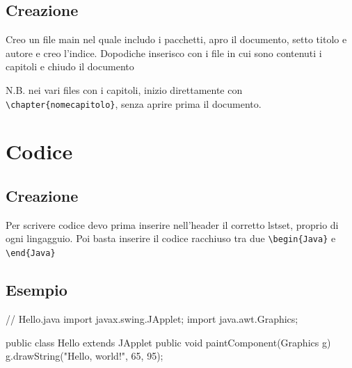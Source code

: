 \section{Creazione}
Creo un file main nel quale includo i pacchetti, apro il documento, setto titolo e autore e creo l'indice. Dopodiche inserisco con \verb|| i file in cui sono contenuti i capitoli e chiudo il documento

N.B. nei vari files con i capitoli, inizio direttamente con \verb|\chapter{nomecapitolo}|, senza aprire prima il documento.

\chapter{Codice}
\section{Creazione}
Per scrivere codice devo prima inserire nell'header il corretto lstset, proprio di ogni lingagguio.
Poi basta inserire il codice racchiuso tra due \verb|\begin{Java}| e \verb|\end{Java}|
\section{Esempio}
\begin{Java}
// Hello.java
import javax.swing.JApplet;
import java.awt.Graphics;

public class Hello extends JApplet {
    public void paintComponent(Graphics g) {
        g.drawString("Hello, world!", 65, 95);
    }    
}
\end{Java}